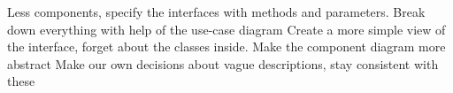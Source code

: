Less components, specify the interfaces with methods and parameters.
Break down everything with help of the use-case diagram
Create a more simple view of the interface, forget about the classes inside.
Make the component diagram more abstract
Make our own decisions about vague descriptions, stay consistent with these